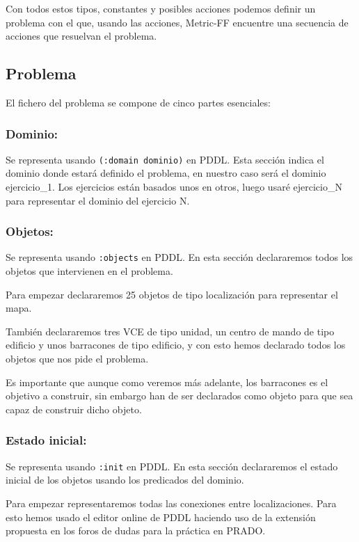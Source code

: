 \documentclass[10pt, spanish]{article}
\begin{document}
Con todos estos tipos, constantes y posibles acciones podemos definir un problema con el que, usando las acciones, Metric-FF encuentre una secuencia de acciones que resuelvan el problema.

\subsection{Problema}

El fichero del problema se compone de cinco partes esenciales:

\subsubsection{Dominio:}

Se representa usando \texttt{(:domain dominio)} en PDDL. Esta sección indica el dominio donde estará definido el problema, en nuestro caso será el dominio ejercicio\_1. Los ejercicios están basados unos en otros, luego usaré ejercicio\_N para representar el dominio del ejercicio N.

\subsubsection{Objetos:}

Se representa usando \texttt{:objects} en PDDL. En esta sección declararemos todos los objetos que intervienen en el problema.

Para empezar declararemos 25 objetos de tipo localización para representar el mapa.

También declararemos tres VCE de tipo unidad, un centro de mando de tipo edificio y unos barracones de tipo edificio, y con esto hemos declarado todos los objetos que nos pide el problema.

Es importante que aunque como veremos más adelante, los barracones es el objetivo a construir, sin embargo han de ser declarados como objeto para que sea capaz de construir dicho objeto.


\subsubsection{Estado inicial:}

Se representa usando \texttt{:init} en PDDL. En esta sección declararemos el estado inicial de los objetos usando los predicados del dominio.

Para empezar representaremos todas las conexiones entre localizaciones. Para esto hemos usado el editor online de PDDL haciendo uso de la extensión propuesta en los foros de dudas para la práctica en PRADO.
\end{document}
